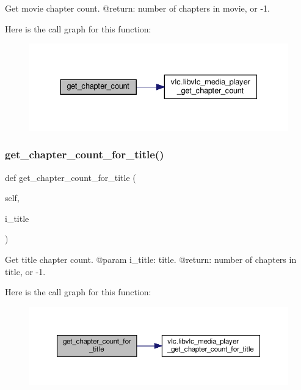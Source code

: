 \begin{DoxyVerb}Get movie chapter count.
@return: number of chapters in movie, or -1.
\end{DoxyVerb}
 Here is the call graph for this function\+:
\nopagebreak
\begin{figure}[H]
\begin{center}
\leavevmode
\includegraphics[width=331pt]{classvlc_1_1_media_player_a2e2abfffa1b82c0cf09b870524e0b274_cgraph}
\end{center}
\end{figure}
\mbox{\label{classvlc_1_1_media_player_ab4564aebe511a4ab75ece367203bfbdf}} 
\subsubsection{\texorpdfstring{get\+\_\+chapter\+\_\+count\+\_\+for\+\_\+title()}{get\_chapter\_count\_for\_title()}}
{\footnotesize\ttfamily def get\+\_\+chapter\+\_\+count\+\_\+for\+\_\+title (\begin{DoxyParamCaption}\item[{}]{self,  }\item[{}]{i\+\_\+title }\end{DoxyParamCaption})}

\begin{DoxyVerb}Get title chapter count.
@param i_title: title.
@return: number of chapters in title, or -1.
\end{DoxyVerb}
 Here is the call graph for this function\+:
\nopagebreak
\begin{figure}[H]
\begin{center}
\leavevmode
\includegraphics[width=350pt]{classvlc_1_1_media_player_ab4564aebe511a4ab75ece367203bfbdf_cgraph}
\end{center}
\end{figure}
\mbox{\label{classvlc_1_1_media_player_a823cac8c86fef8482ec276c7988e0154}} 
